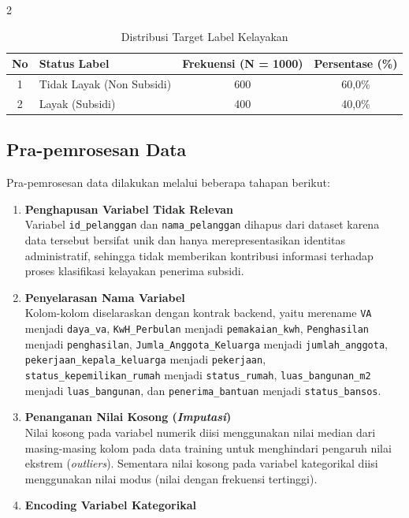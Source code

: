 \documentclass[12pt, a4paper, onecolumn, oneside]{report}
\begin{document}
\begin{spacing}{2}
\begin{table}[H]
\centering
\caption{Distribusi Target Label Kelayakan}
\label{tab:dist_label}
\begin{tabular}{|c|l|c|c|}
\hline
\textbf{No} & \textbf{Status Label} & \textbf{Frekuensi (N = 1000)} & \textbf{Persentase (\%)} \\ \hline
1 & Tidak Layak (Non Subsidi) & 600 & 60,0\% \\ \hline
2 & Layak (Subsidi) & 400 & 40,0\% \\ \hline
\end{tabular}
\end{table}

\subsection{Pra-pemrosesan Data}
Pra-pemrosesan data dilakukan melalui beberapa tahapan berikut:
\begin{enumerate}
    \item \textbf{Penghapusan Variabel Tidak Relevan} \\
    Variabel \texttt{id\_pelanggan} dan \texttt{nama\_pelanggan} dihapus dari dataset karena data tersebut bersifat unik dan hanya merepresentasikan identitas administratif, sehingga tidak memberikan kontribusi informasi terhadap proses klasifikasi kelayakan penerima subsidi.
    \item \textbf{Penyelarasan Nama Variabel} \\
    Kolom-kolom diselaraskan dengan kontrak backend, yaitu merename \texttt{VA } menjadi \texttt{daya\_va}, \texttt{KwH\_Perbulan} menjadi \texttt{pemakaian\_kwh}, \texttt{Penghasilan} menjadi \texttt{penghasilan}, \texttt{Jumla\_Anggota\_Keluarga} menjadi \texttt{jumlah\_anggota}, \texttt{pekerjaan\_kepala\_keluarga} menjadi \texttt{pekerjaan}, \texttt{status\_kepemilikan\_rumah} menjadi \texttt{status\_rumah}, \texttt{luas\_bangunan\_m2} menjadi \texttt{luas\_bangunan}, dan \texttt{penerima\_bantuan} menjadi \texttt{status\_bansos}.
    \item \textbf{Penanganan Nilai Kosong (\textit{Imputasi})} \\
    Nilai kosong pada variabel numerik diisi menggunakan nilai median dari masing-masing kolom pada data training untuk menghindari pengaruh nilai ekstrem (\textit{outliers}). Sementara nilai kosong pada variabel kategorikal diisi menggunakan nilai modus (nilai dengan frekuensi tertinggi).
    \item \textbf{Encoding Variabel Kategorikal} \\

\end{enumerate}
\end{spacing}
\end{document}
